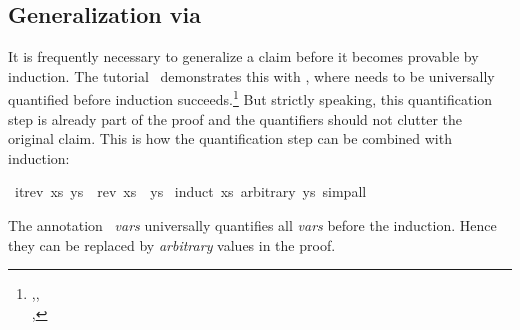 \begin{isabellebody}
\begin{isamarkuptext}
\subsection{Generalization via }

It is frequently necessary to generalize a claim before it becomes
provable by induction. The tutorial~\cite{LNCS2283} demonstrates this
with , where 
needs to be universally quantified before induction succeeds.\footnote{,\quad {},\\ ,\quad {}} But
strictly speaking, this quantification step is already part of the
proof and the quantifiers should not clutter the original claim. This
is how the quantification step can be combined with induction:%
\end{isamarkuptext}%
\isamarkuptrue%
\isamarkupfalse%
\ {}itrev\ xs\ ys\ {}\ rev\ xs\ {}\ ys{}\isanewline
%
\isadelimproof
%
\endisadelimproof
%
\isatagproof
{}\isamarkupfalse%
\ {}induct\ xs\ arbitrary{}\ ys{}\ simp{}all%
\endisatagproof
{\isafoldproof}%
%
\isadelimproof
%
\endisadelimproof
%
\begin{isamarkuptext}%
\noindent The annotation ~\emph{vars}
universally quantifies all \emph{vars} before the induction.  Hence
they can be replaced by \emph{arbitrary} values in the proof.


\end{isamarkuptext}
\end{isabellebody}

